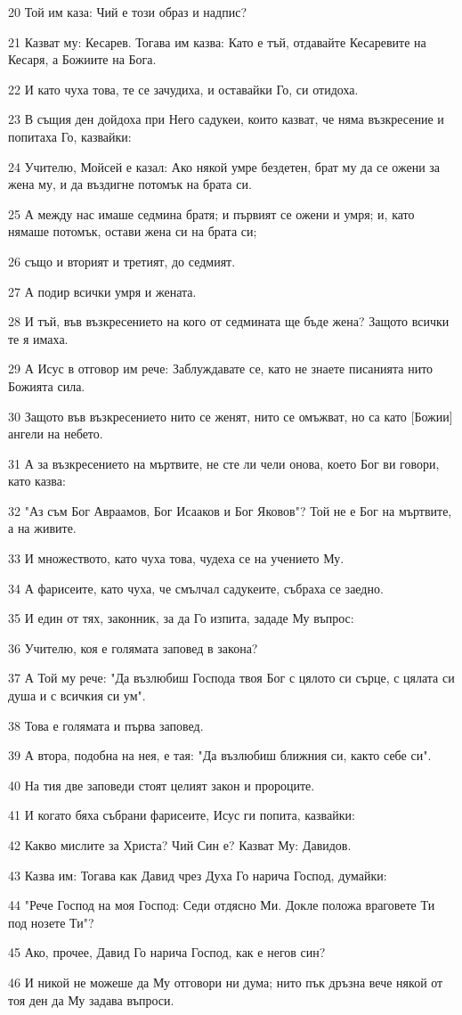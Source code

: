 \par 20 Той им каза: Чий е този образ и надпис?
\par 21 Казват му: Кесарев. Тогава им казва: Като е тъй, отдавайте Кесаревите на Кесаря, а Божиите на Бога.
\par 22 И като чуха това, те се зачудиха, и оставайки Го, си отидоха.
\par 23 В същия ден дойдоха при Него садукеи, които казват, че няма възкресение и попитаха Го, казвайки:
\par 24 Учителю, Мойсей е казал: Ако някой умре бездетен, брат му да се ожени за жена му, и да въздигне потомък на брата си.
\par 25 А между нас имаше седмина братя; и първият се ожени и умря; и, като нямаше потомък, остави жена си на брата си;
\par 26 също и вторият и третият, до седмият.
\par 27 А подир всички умря и жената.
\par 28 И тъй, във възкресението на кого от седмината ще бъде жена? Защото всички те я имаха.
\par 29 А Исус в отговор им рече: Заблуждавате се, като не знаете писанията нито Божията сила.
\par 30 Защото във възкресението нито се женят, нито се омъжват, но са като [Божии] ангели на небето.
\par 31 А за възкресението на мъртвите, не сте ли чели онова, което Бог ви говори, като казва:
\par 32 "Аз съм Бог Авраамов, Бог Исааков и Бог Яковов"? Той не е Бог на мъртвите, а на живите.
\par 33 И множеството, като чуха това, чудеха се на учението Му.
\par 34 А фарисеите, като чуха, че смълчал садукеите, събраха се заедно.
\par 35 И един от тях, законник, за да Го изпита, зададе Му въпрос:
\par 36 Учителю, коя е голямата заповед в закона?
\par 37 А Той му рече: "Да възлюбиш Господа твоя Бог с цялото си сърце, с цялата си душа и с всичкия си ум".
\par 38 Това е голямата и първа заповед.
\par 39 А втора, подобна на нея, е тая: "Да възлюбиш ближния си, както себе си".
\par 40 На тия две заповеди стоят целият закон и пророците.
\par 41 И когато бяха събрани фарисеите, Исус ги попита, казвайки:
\par 42 Какво мислите за Христа? Чий Син е? Казват Му: Давидов.
\par 43 Казва им: Тогава как Давид чрез Духа Го нарича Господ, думайки:
\par 44 "Рече Господ на моя Господ: Седи отдясно Ми. Докле положа враговете Ти под нозете Ти"?
\par 45 Ако, прочее, Давид Го нарича Господ, как е негов син?
\par 46 И никой не можеше да Му отговори ни дума; нито пък дръзна вече някой от тоя ден да Му задава въпроси.

